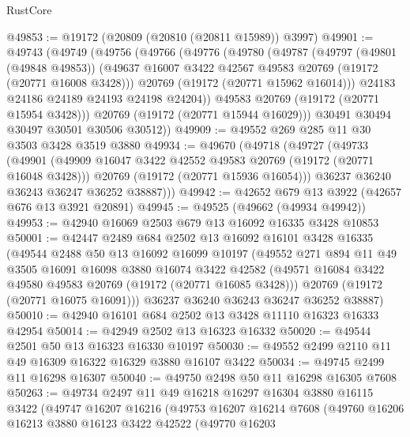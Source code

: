 \begin{lexlean}{RustCore}
\begin{coremodule}
@49853 := @19172 (@20809 (@20810 (@20811 @15989)) @3997)
@49901 := @49743
    (@49749
      (@49756
        (@49766
          (@49776
            (@49780
              (@49787
                (@49797
                  (@49801 (@49848 @49853))
                  (@49637 @16007 @3422 @42567 @49583 @20769 (@19172 (@20771 @16008 @3428)))
                  @20769
                  (@19172 (@20771 @15962 @16014)))
                @24183
                @24186
                @24189
                @24193
                @24198
                @24204))
            @49583
            @20769
            (@19172 (@20771 @15954 @3428)))
          @20769
          (@19172 (@20771 @15944 @16029)))
        @30491
        @30494
        @30497
        @30501
        @30506
        @30512))
@49909 := @49552 @269 @285 @11 @30 @3503 @3428 @3519 @3880
@49934 := @49670
    (@49718
      (@49727
        (@49733
          (@49901
            (@49909 @16047 @3422 @42552 @49583 @20769 (@19172 (@20771 @16048 @3428)))
            @20769
            (@19172 (@20771 @15936 @16054)))
          @36237
          @36240
          @36243
          @36247
          @36252
          @38887)))
@49942 := @42652 @679 @13 @3922 (@42657 @676 @13 @3921 @20891)
@49945 := @49525 (@49662 (@49934 @49942))
@49953 := @42940 @16069 @2503 @679 @13 @16092 @16335 @3428 @10853
@50001 := @42447
    @2489
    @684
    @2502
    @13
    @16092
    @16101
    @3428
    @16335
    (@49544
      @2488
      @50
      @13
      @16092
      @16099
      @10197
      (@49552
        @271
        @894
        @11
        @49
        @3505
        @16091
        @16098
        @3880
        @16074
        @3422
        @42582
        (@49571 @16084 @3422 @49580 @49583 @20769 (@19172 (@20771 @16085 @3428)))
        @20769
        (@19172 (@20771 @16075 @16091)))
      @36237
      @36240
      @36243
      @36247
      @36252
      @38887)
@50010 := @42940 @16101 @684 @2502 @13 @3428 @11110 @16323 @16333 @42954
@50014 := @42949 @2502 @13 @16323 @16332
@50020 := @49544 @2501 @50 @13 @16323 @16330 @10197
@50030 := @49552 @2499 @2110 @11 @49 @16309 @16322 @16329 @3880 @16107 @3422
@50034 := @49745 @2499 @11 @16298 @16307
@50040 := @49750 @2498 @50 @11 @16298 @16305 @7608
@50263 := @49734
    @2497
    @11
    @49
    @16218
    @16297
    @16304
    @3880
    @16115
    @3422
    (@49747
      @16207
      @16216
      (@49753
        @16207
        @16214
        @7608
        (@49760
          @16206
          @16213
          @3880
          @16123
          @3422
          @42522
          (@49770
            @16203

\end{coremodule}
\end{lexlean}
